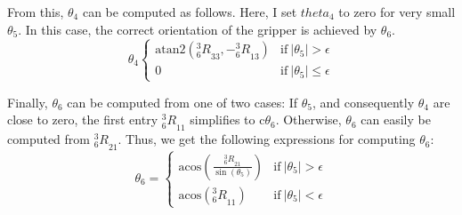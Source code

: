 \documentclass[twoside]{article}
\renewcommand{\c}{\text{c}}
\newcommand{\R}[2]{\mbox{$_{#2}^{#1}{R}$}}
\begin{document}
From this, $\theta_4$ can be computed as follows. Here, I set $theta_4$ to zero for very small
$\theta_5$. In this case, the correct orientation of the gripper is achieved by $\theta_6$.
\begin{equation}
  \theta_4
  \begin{cases}
    \text{atan2}\left(\R{3}{6}_{33}, -\R{3}{6}_{13}\right) & \text{if}\ |\theta_5| > \epsilon \\
    0                                           & \text{if}\ |\theta_5| \leq \epsilon
  \end{cases}
\end{equation}

Finally, $\theta_6$ can be computed from one of two cases: If $\theta_5$, and
consequently $\theta_4$ are close to zero, the first entry $\R{3}{6}_{11}$ simplifies to
$\c\theta_6$. Otherwise, $\theta_6$ can easily be computed from $\R{3}{6}_{21}$.
Thus, we get the following expressions for computing $\theta_6$:
\begin{equation}
  \theta_6 =
  \begin{cases}
     \text{acos}\left(\frac{\R{3}{6}_{21}}{\sin(\theta_5)}\right) & \text{if}\ |\theta_5| > \epsilon \\
     \text{acos}\left(\R{3}{6}_{11}\right)                & \text{if}\ |\theta_5| < \epsilon
  \end{cases}
\end{equation}



%
%
\end{document}

